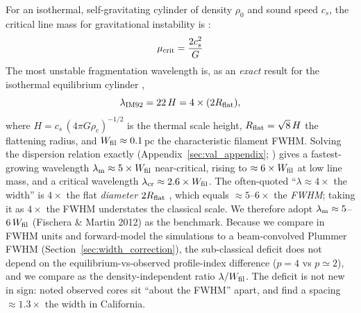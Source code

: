 \documentclass[usenatbib,twoside,twocolumn]{mnras}
\begin{document}
For an isothermal, self-gravitating cylinder of density $\rho_0$ and sound speed $c_s$, the critical line mass for gravitational instability is \citep{Ostriker1964}:
\begin{equation}
\mu_{\rm crit} = \frac{2c_s^2}{G}
\label{eq:mucrit}
\end{equation}
The most unstable fragmentation wavelength is, as an \emph{exact} result for the isothermal equilibrium cylinder \citep{Inutsuka1992},
\begin{equation}
\lambda_{\rm IM92} = 22\,H = 4\times(2R_{\rm flat}),
\label{eq:im92}
\end{equation}
where $H = c_s\,(4\pi G\rho_c)^{-1/2}$ is the thermal scale height, $R_{\rm flat}=\sqrt8\,H$ the flattening radius, and $W_{\rm fil}\approx0.1$\,pc the characteristic filament FWHM. Solving the dispersion relation exactly (Appendix~\ref{sec:val_appendix}; \citealt{Fischera2012}) gives a fastest-growing wavelength $\lambda_{\rm m}\approx5\times W_{\rm fil}$ near-critical, rising to $\approx6\times W_{\rm fil}$ at low line mass, and a critical wavelength $\lambda_{\rm cr}\approx2.6\times W_{\rm fil}$. The often-quoted ``$\lambda\approx4\times$ the width'' is $4\times$ the flat \emph{diameter} $2R_{\rm flat}$ \citep{Inutsuka1992}, which equals $\approx5$--$6\times$ the \emph{FWHM}; taking it as $4\times$ the FWHM understates the classical scale. We therefore adopt $\lambda_{\rm m}\approx5$--$6\,W_{\rm fil}$ (Fischera \& Martin 2012) as the benchmark. Because we compare in FWHM units and forward-model the simulations to a beam-convolved Plummer FWHM (Section~\ref{sec:width_correction}), the sub-classical deficit does not depend on the equilibrium-vs-observed profile-index difference ($p=4$ vs $p\simeq2$), and we compare as the density-independent ratio $\lambda/W_{\rm fil}$. The deficit is not new in sign: \citet{Fischera2012} noted observed cores sit ``about the FWHM'' apart, and \citet{Zhang2023cal} find a spacing $\approx1.3\times$ the width in California.
\end{document}
